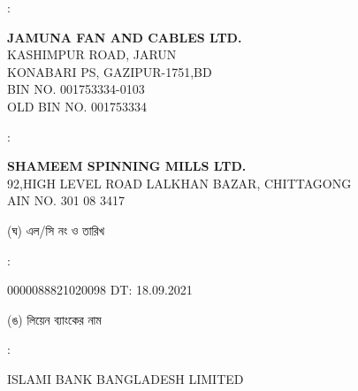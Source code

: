 \documentclass[12pt]{article}
\newcommand{\lcno}{0000088821020098}
\newcommand{\lcdt}{18.09.2021}
\newcommand{\lienbank}{ISLAMI BANK BANGLADESH LIMITED}
\newcommand{\jfcl}{JAMUNA FAN AND CABLES LTD.}
\newcommand{\jfcla}{KASHIMPUR ROAD, JARUN
\\
KONABARI PS, GAZIPUR-1751,BD}
\newcommand{\impn}{\jfcl}
\newcommand{\impadd}{\jfcla}
\newcommand{\impbin}{001753334-0103}
\newcommand{\impoldbin}{001753334}
\newcommand{\cnfn}{SHAMEEM SPINNING MILLS LTD.}
\newcommand{\cnfadd}{92,HIGH LEVEL ROAD
\newline
LALKHAN BAZAR, CHITTAGONG}
\newcommand{\cnfain}{301 08 3417}
\begin{document}
\begin{minipage}[t]{0.02\linewidth}
:
\end{minipage}
\begin{minipage}[t]{0.50\linewidth}
\textbf{{\impn}}
\\
{\impadd}
\\
BIN NO. {\impbin}
\\
OLD BIN NO. {\impoldbin}
\\
\end{minipage}
\begin{minipage}[t]{0.05\linewidth}
\hspace*{1em}
\end{minipage}
\begin{minipage}[t]{0.45\linewidth}
\end{minipage}
\begin{minipage}[t]{0.02\linewidth}
:
\end{minipage}
\begin{minipage}[t]{0.50\linewidth}
\textbf{{\cnfn}}
\\
{\cnfadd}
\\
AIN NO. {\cnfain}
\\
\end{minipage}
\begin{minipage}[t]{0.05\linewidth}
\hspace*{1em}
\end{minipage}
\begin{minipage}[t]{0.45\linewidth}
(ঘ) এল/সি নং ও তারিখ
\end{minipage}
\begin{minipage}[t]{0.02\linewidth}
:
\end{minipage}
\begin{minipage}[t]{0.50\linewidth}
{\lcno} \hspace{2em} DT: {\lcdt}
\\
\end{minipage}
\begin{minipage}[t]{0.05\linewidth}
\hspace*{1em}
\end{minipage}
\begin{minipage}[t]{0.45\linewidth}
(ঙ) লিয়েন ব্যাংকের নাম
\end{minipage}
\begin{minipage}[t]{0.02\linewidth}
:
\end{minipage}
\begin{minipage}[t]{0.50\linewidth}
{\lienbank}
\\
\end{minipage}
\end{document}
